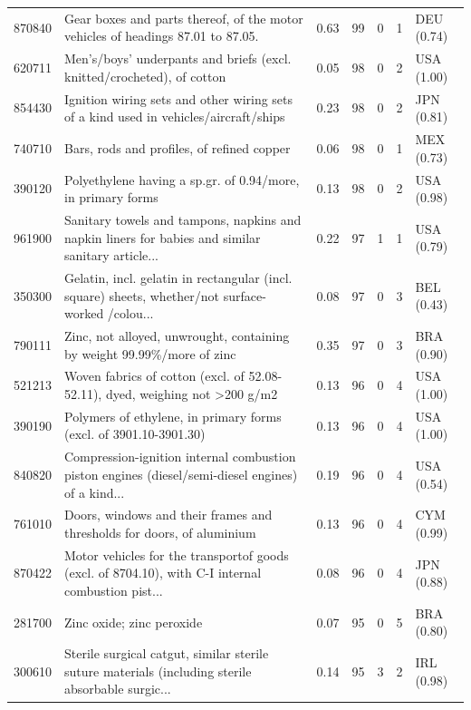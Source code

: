 \begin{tabular}{@{}l p{6.4cm} r r r r l@{}}
870840 & Gear boxes and parts thereof, of the motor vehicles of headings 87.01 to 87.05. & 0.63 & 99 & 0 & 1 & DEU (0.74) \\
620711 & Men's/\allowbreak{}boys' underpants and briefs (excl. knitted/\allowbreak{}crocheted), of cotton & 0.05 & 98 & 0 & 2 & USA (1.00) \\
854430 & Ignition wiring sets and other wiring sets of a kind used in vehicles/\allowbreak{}aircraft/\allowbreak{}ships & 0.23 & 98 & 0 & 2 & JPN (0.81) \\
740710 & Bars, rods and profiles, of refined copper & 0.06 & 98 & 0 & 1 & MEX (0.73) \\
390120 & Polyethylene having a sp.gr. of 0.94/\allowbreak{}more, in primary forms & 0.13 & 98 & 0 & 2 & USA (0.98) \\
961900 & Sanitary towels and tampons, napkins and napkin liners for babies and similar sanitary article... & 0.22 & 97 & 1 & 1 & USA (0.79) \\
350300 & Gelatin, incl. gelatin in rectangular (incl. square) sheets, whether/\allowbreak{}not surface-worked /\allowbreak{}colou... & 0.08 & 97 & 0 & 3 & BEL (0.43) \\
790111 & Zinc, not alloyed, unwrought, containing by weight 99.99\%/\allowbreak{}more of zinc & 0.35 & 97 & 0 & 3 & BRA (0.90) \\
521213 & Woven fabrics of cotton (excl. of 52.08-52.11), dyed, weighing not >200 g/\allowbreak{}m2 & 0.13 & 96 & 0 & 4 & USA (1.00) \\
390190 & Polymers of ethylene, in primary forms (excl. of 3901.10-3901.30) & 0.13 & 96 & 0 & 4 & USA (1.00) \\
840820 & Compression-ignition internal combustion piston engines (diesel/\allowbreak{}semi-diesel engines) of a kind... & 0.19 & 96 & 0 & 4 & USA (0.54) \\
761010 & Doors, windows and their frames and thresholds for doors, of aluminium & 0.13 & 96 & 0 & 4 & CYM (0.99) \\
870422 & Motor vehicles for the transportof goods (excl. of 8704.10), with C-I internal combustion pist... & 0.08 & 96 & 0 & 4 & JPN (0.88) \\
281700 & Zinc oxide; zinc peroxide & 0.07 & 95 & 0 & 5 & BRA (0.80) \\
300610 & Sterile surgical catgut, similar sterile suture materials (including sterile absorbable surgic... & 0.14 & 95 & 3 & 2 & IRL (0.98) \\
\bottomrule
\end{tabular}
